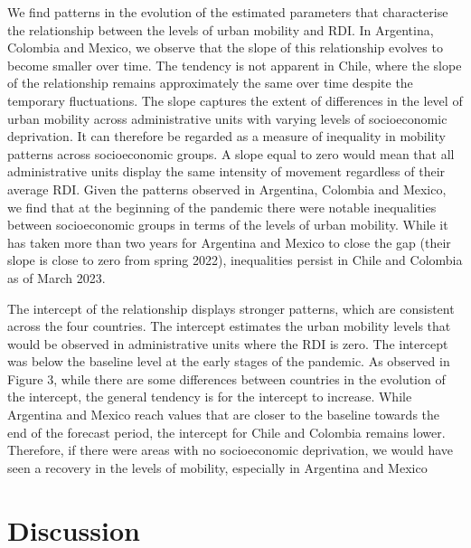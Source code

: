 \documentclass[
  11pt,
]{article}
\begin{document}
We find patterns in the evolution of the estimated parameters that
characterise the relationship between the levels of urban mobility and
RDI. In Argentina, Colombia and Mexico, we observe that the slope of
this relationship evolves to become smaller over time. The tendency is
not apparent in Chile, where the slope of the relationship remains
approximately the same over time despite the temporary fluctuations. The
slope captures the extent of differences in the level of urban mobility
across administrative units with varying levels of socioeconomic
deprivation. It can therefore be regarded as a measure of inequality in
mobility patterns across socioeconomic groups. A slope equal to zero
would mean that all administrative units display the same intensity of
movement regardless of their average RDI. Given the patterns observed in
Argentina, Colombia and Mexico, we find that at the beginning of the
pandemic there were notable inequalities between socioeconomic groups in
terms of the levels of urban mobility. While it has taken more than two
years for Argentina and Mexico to close the gap (their slope is close to
zero from spring 2022), inequalities persist in Chile and Colombia as of
March 2023.

The intercept of the relationship displays stronger patterns, which are
consistent across the four countries. The intercept estimates the urban
mobility levels that would be observed in administrative units where the
RDI is zero. The intercept was below the baseline level at the early
stages of the pandemic. As observed in Figure 3, while there are some
differences between countries in the evolution of the intercept, the
general tendency is for the intercept to increase. While Argentina and
Mexico reach values that are closer to the baseline towards the end of
the forecast period, the intercept for Chile and Colombia remains lower.
Therefore, if there were areas with no socioeconomic deprivation, we
would have seen a recovery in the levels of mobility, especially in
Argentina and Mexico

\section{Discussion}\label{sec-discussion}
\end{document}
